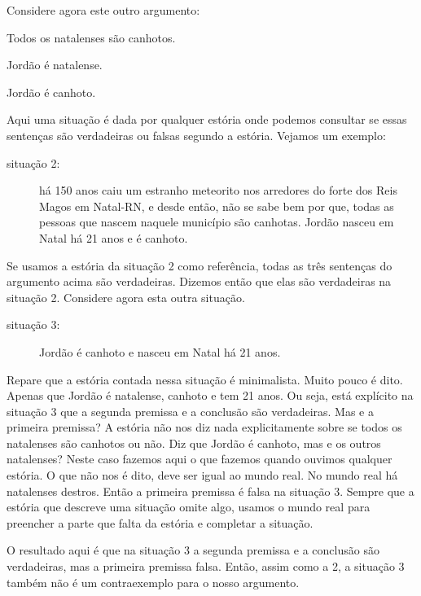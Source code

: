Considere agora este outro argumento:
\begin{earg}
	\item[] Todos os natalenses são canhotos.
	\item[] Jordão é  natalense.
	\item[\therefore] Jordão é canhoto.
\end{earg}
Aqui uma situação é dada por qualquer estória onde podemos consultar se essas sentenças são verdadeiras ou falsas segundo a estória.
Vejamos um exemplo:

\begin{description}
	\item[situação 2:] há 150 anos caiu um estranho meteorito nos arredores do forte dos Reis Magos em Natal-RN, e desde então, não se sabe bem por que, todas as pessoas que nascem naquele município são canhotas. Jordão nasceu em Natal há 21 anos e é canhoto.
\end{description} 
Se usamos a estória da situação 2 como referência, todas as três sentenças do argumento acima são verdadeiras.
Dizemos então que elas são verdadeiras na situação 2.
Considere agora esta outra situação.

\begin{description}
	\item[situação 3:] Jordão é canhoto e nasceu em Natal há 21 anos.
\end{description} 
Repare que a estória contada nessa situação é minimalista.
Muito pouco é dito. Apenas que Jordão é natalense, canhoto e tem 21 anos.
Ou seja, está explícito na situação 3 que a segunda premissa e a conclusão são verdadeiras.
Mas e a primeira premissa?
A estória não nos diz nada explicitamente sobre se todos os natalenses são canhotos ou não.
Diz que Jordão é canhoto, mas e os outros natalenses?
Neste caso fazemos aqui o que fazemos quando ouvimos qualquer estória. O que não nos é dito, deve ser igual ao mundo real.
No mundo real há natalenses destros.
Então a primeira premissa é falsa na situação 3.
Sempre que a estória que descreve uma situação omite algo, usamos o mundo real para preencher a parte que falta da estória e completar a situação.

O resultado aqui é que na situação 3 a segunda premissa e a conclusão são verdadeiras, mas a primeira premissa falsa.
Então, assim como a 2, a situação 3 também não é um contraexemplo para o nosso argumento.

